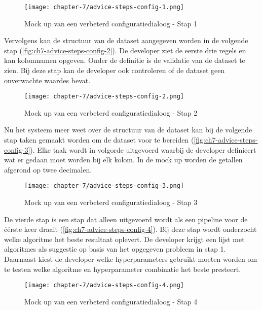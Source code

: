 \newpage

\begin{figure}[hbt!]
  \centering
  \texttt{[image: chapter-7/advice-steps-config-1.png]}
  \caption{Mock up van een verbeterd configuratiedialoog - Stap 1}
  \label{fig:ch7-advice-steps-config-1}
\end{figure}

Vervolgens kan de structuur van de dataset aangegeven worden in de volgende stap (\autoref{fig:ch7-advice-steps-config-2}). De developer ziet de eerste drie regels en kan kolomnamen opgeven. Onder de definitie is de validatie van de dataset te zien. Bij deze stap kan de developer ook controleren of de dataset geen onverwachte waardes bevat.

\newpage

\begin{figure}[hbt!]
  \centering
  \texttt{[image: chapter-7/advice-steps-config-2.png]}
  \caption{Mock up van een verbeterd configuratiedialoog - Stap 2}
  \label{fig:ch7-advice-steps-config-2}
\end{figure}

Nu het systeem meer weet over de structuur van de dataset kan bij de volgende stap taken gemaakt worden om de dataset voor te bereiden (\autoref{fig:ch7-advice-steps-config-3}). Elke taak wordt in volgorde uitgevoerd waarbij de developer definieert wat er gedaan moet worden bij elk kolom. In de mock up worden de getallen afgerond op twee decimalen.

\begin{figure}[hbt!]
  \centering
  \texttt{[image: chapter-7/advice-steps-config-3.png]}
  \caption{Mock up van een verbeterd configuratiedialoog - Stap 3}
  \label{fig:ch7-advice-steps-config-3}
\end{figure}

De vierde stap is een stap dat alleen uitgevoerd wordt als een pipeline voor de éérste keer draait (\autoref{fig:ch7-advice-steps-config-4}). Bij deze stap wordt onderzocht welke algoritme het beste resultaat oplevert. De developer krijgt een lijst met algoritmes als suggestie op basis van het opgegeven probleem in stap 1. Daarnaast kiest de developer welke hyperparameters gebruikt moeten worden om te testen welke algoritme en hyperparameter combinatie het beste presteert.

\begin{figure}[hbt!]
  \centering
  \texttt{[image: chapter-7/advice-steps-config-4.png]}
  \caption{Mock up van een verbeterd configuratiedialoog - Stap 4}
  \label{fig:ch7-advice-steps-config-4}
\end{figure}

